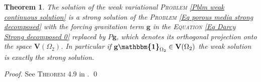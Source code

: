 \documentclass[3p]{elsarticle}
\newtheorem{theorem}{Theorem}
\def\V{\mathbf V}
\def\g{\mathbf g}
\def\ind{\boldsymbol{\mathbbm{1}}}
\begin{document}
%
%
\begin{theorem}\label{Th weak formulation of continuos version}
The solution of the weak variational \textsc{Problem} \eqref{Pblm weak continuous solution} is a strong solution of the \textsc{Problem} \eqref{Eq porous media strong decomposed} with the forcing gravitation term $\g$ in the \textsc{Equation} \eqref{Eq Darcy Strong decomposed 0} replaced by $P\g$, which denotes its orthogonal projection onto the space $\V(\Omega_{2})$. In particular if $\g\ind_{\Omega_{2}} \in \V(\Omega_{2})$ the weak solution is exactly the strong solution.
%
\end{theorem}
%
\begin{proof} See \textsc{Theorem 4.9} in \cite{MoralesNaranjo}.
   \qed
\end{proof}
%
%
%
%
%
%
%
%
%
%
%
%
%
%
%
%
%
\end{document}
